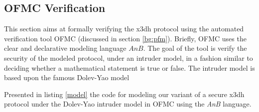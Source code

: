 \subsection{OFMC Verification}
This section aims at formally verifying the \gls{x3dh} protocol using the automated verification tool OFMC (discussed in section \ref{bg:pfm}). Briefly, OFMC uses the clear and declarative modeling language $AnB$. The goal of the tool is verify the security of the modeled protocol, under an intruder model, in a fashion similar to deciding whether a mathematical statement is true or false. The intruder model is based upon the famous Dolev-Yao model \cite{bibid} 

Presented in listing \ref{model} the code for modeling our variant of a secure \gls{x3dh} protocol  under the Dolev-Yao intruder model in OFMC using the \textit{AnB} language.



